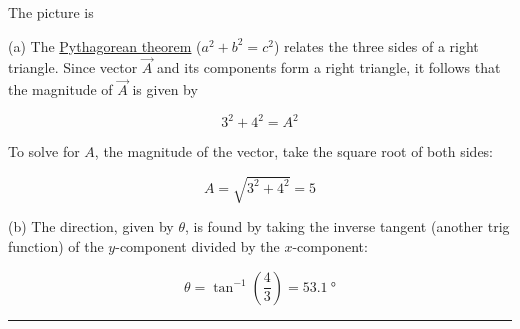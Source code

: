 \documentclass[main.tex]{subfiles}
\begin{document}
\Solution The picture is

\begin{figure}[h!]
    \centering
{}
\end{figure}

(a) The \href{https://mathworld.wolfram.com/PythagoreanTheorem.html}{Pythagorean theorem} ($a^2 + b^2 = c^2$) relates the three sides of a right triangle. Since vector $\vec{A}$ and its components form a right triangle, it follows that the magnitude of $\vec{A}$ is given by

\begin{equation*}
    3^2 + 4^2 = A^2
\end{equation*}

To solve for $A$, the magnitude of the vector, take the square root of both sides:

\begin{equation*}
    A = \sqrt{3^2 + 4^2} = 5
\end{equation*}

(b) The direction, given by $\theta$, is found by taking the inverse tangent (another trig function) of the $y$-component divided by the $x$-component:

\begin{equation*}
    \theta = \tan^{-1}\left(\frac{4}{3}\right) = \SI{53.1}{\degree}
\end{equation*}

\hrule

\clearpage
\end{document}
